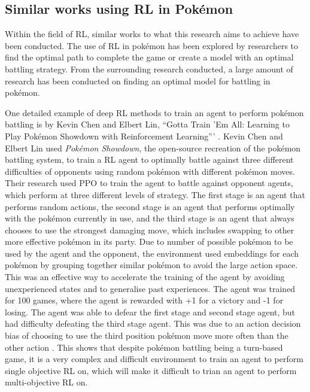 \subsection{Similar works using RL in Pokémon}

Within the field of RL, similar works to what this research aims to achieve have been conducted. The use of RL in pokémon has been explored by researchers to find the optimal path to complete the game or create a model with an optimal battling strategy. From the surrounding research conducted, a large amount of research has been conducted on finding an optimal model for battling in pokémon. 

One detailed example of deep RL methods to train an agent to perform pokémon battling is by Kevin Chen and Elbert Lin, ``Gotta Train 'Em All: Learning to Play Pokémon Showdown with Reinforcement Learning''' \cite{chen2018gotta}. Kevin Chen and Elbert Lin used \textit{Pokémon Showdown}, the open-source recreation of the pokémon battling system, to train a RL agent to optimally battle against three different difficulties of opponents using random pokémon with different pokémon moves. Their research used PPO to train the agent to battle against opponent agents, which perform at three different levels of strategy. The first stage is an agent that performs random actions, the second stage is an agent that performs optimally with the pokémon currently in use, and the third stage is an agent that always chooses to use the strongest damaging move, which includes swapping to other more effective pokémon in its party. Due to number of possible pokémon to be used by the agent and the opponent, the environment used embeddings for each pokémon by grouping together similar pokémon to avoid the large action space. This was an effective way to accelerate the training of the agent by avoiding unexperienced states and to generalise past experiences. The agent was trained for 100 games, where the agent is rewarded with +1 for a victory and -1 for losing. The agent was able to defear the first stage and second stage agent, but had difficulty defeating the third stage agent. This was due to an action decision bias of choosing to use the third position pokémon move more often than the other action \cite{chen2018gotta}. This shows that despite pokémon battling being a turn-based game, it is a very complex and difficult environment to train an agent to perform single objective RL on, which will make it difficult to trian an agent to perform multi-objective RL on. 

